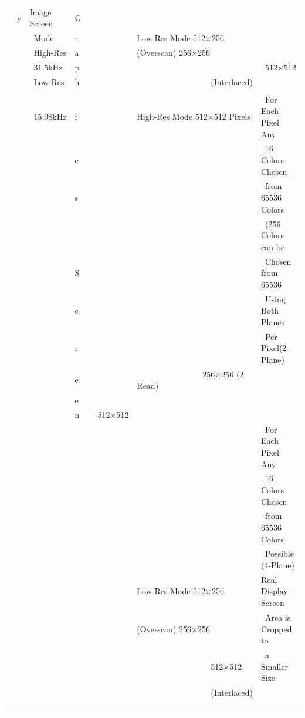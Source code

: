 \documentclass[twoside,a4paper,12pt]{article}
\begin{document}
\begin{tabular}{|p{13mm}|p{23mm}|p{4mm}|p{20mm}|p{65mm}|p{36mm}|}
\ \ y & Image Screen & G & & &\\[2mm]
& \ Mode & r & & Low-Res Mode 512×256 &\\[2mm]
& \ High-Res & a & & (Overscan) 256×256 &\\[2mm]
& \ 31.5kHz & p & & & \ 512×512\\[2mm]
& \ Low-Res & h & & \ \ \ \ \ \ \ \ \ \ \ \ \ \ \ \ \ \ (Interlaced) &\\
\cline{5-6}
& & & & &\\[-4mm]
& \ 15.98kHz & i & & High-Res Mode 512×512 Pixels & \ For Each Pixel Any\\
& & c & & & \ 16 Colors Chosen\\
& & s & & & \ from 65536 Colors\\
& & & & & \ (256 Colors can be\\
& & S & & & \ Chosen from 65536\\
& & c & & & \ Using Both Planes\\
& & r & & & \ Per Pixel(2-Plane)\\
& & e & & \ \ \ \ \ \ \ \ \ \ \ \ \ \ \ \ 256×256 (2 Read) &\\
& & e & & &\\
& & n & \ \ 512×512 & &\\
& & & & & \ For Each Pixel Any\\
& & & & & \ 16 Colors Chosen\\
& & & & & \ from 65536 Colors\\
& & & & & \ Possible (4-Plane)\\
& & & & Low-Res Mode 512×256	& Real Display Screen\\
& & & & (Overscan) 256×256 & \ Area is Cropped to\\
& & & & \ \ \ \ \ \ \ \ \ \ \ \ \ \ \ \ \ \ 512×512 & \ a Smaller Size\\
& & & & \ \ \ \ \ \ \ \ \ \ \ \ \ \ \ \ \ \ (Interlaced) &\\
& & & & &\\
& & & & &\\
& & & & &\\
& & & & &\\
\hline
\end{tabular}

\newpage
\end{document}
